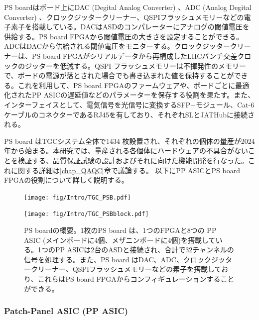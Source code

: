     PS boardはボード上にDAC  (Degital Analog Converter) 、ADC  (Analog Degital Converter) 、クロックジッタークリーナー、QSPIフラッシュメモリーなどの電子素子を搭載している。DACはASDのコンパレーターにアナログの閾値電圧を供給する。PS board FPGAから閾値電圧の大きさを設定することができる。ADCはDACから供給される閾値電圧をモニターする。クロックジッタークリーナーは、PS board FPGAがシリアルデータから再構成したLHCバンチ交差クロックのジッターを低減する。QSPI フラッシュメモリーは不揮発性のメモリーで、ボードの電源が落とされた場合でも書き込まれた値を保持することができる。これを利用して、PS board FPGAのファームウェアや、ボードごとに最適化されたPP ASICの遅延値などのパラメーターを保存する役割を果たす。また、インターフェイスとして、電気信号を光信号に変換するSFP+モジュール、Cat-6ケーブルのコネクターであるRJ45を有しており、それぞれSLとJATHubに接続される。
    
    PS board はTGCシステム全体で1434 枚設置され、それぞれの個体の量産が2024 年から始まる。本研究では、量産される各個体にハードウェアの不具合がないことを検証する、品質保証試験の設計およびそれに向けた機能開発を行なった。これに関する詳細は\ref{chap_QAQC}章で議論する。
    以下にPP ASICとPS board FPGAの役割について詳しく説明する。

    \begin{figure}
    \begin{minipage}[b]{.5\linewidth}
    \centering
    \texttt{[image: fig/Intro/TGC\_PSB.pdf]}
    \end{minipage}%
    \begin{minipage}[b]{.5\linewidth}
    \centering
    \texttt{[image: fig/Intro/TGC\_PSBblock.pdf]}
    \end{minipage}%
    \caption[PS boardの概要]{PS boardの概要。1枚のPS board は、1つのFPGAと8つの PP ASIC (メインボードに4個、メザニンボードに4個)を搭載している。1つのPP ASICは2台のASDと接続され、合計で32チャンネルの信号を処理する。また、PS board はDAC、ADC、クロックジッタークリーナー、QSPIフラッシュメモリーなどの素子を搭載しており、これらはPS board FPGAからコンフィギュレーションすることができる。}
    \label{TGC_PSB}
    \end{figure}

    \subsubsection*{Patch-Panel ASIC (PP ASIC)}


